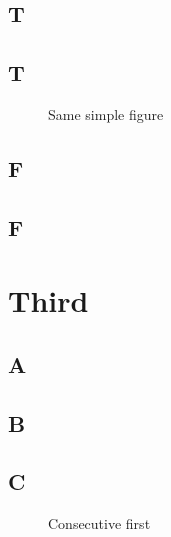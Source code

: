 \documentclass{uoflthesis} %
\begin{document}
\lipsum

\section{T}

\lipsum

\section{T}

\lipsum

\begin{figure}
\centering
{}
\caption{Same simple figure}
\end{figure}
\section{F}

\lipsum

\section{F}

\lipsum

\chapter{Third}

\section{A}

\lipsum

\section{B}

\lipsum

\section{C}

\lipsum

\begin{figure}
\centering
{}
\caption{Consecutive first}
\end{figure}
\end{document}
